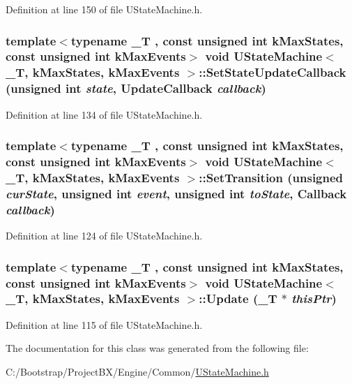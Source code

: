 Definition at line 150 of file UStateMachine.h.\hypertarget{class_u_state_machine_4ad66bcfa1dd9b29fedccc5ee19d5a1d}{
\subsubsection[{SetStateUpdateCallback}]{\setlength{\rightskip}{0pt plus 5cm}template$<$typename \_\-T , const unsigned int kMaxStates, const unsigned int kMaxEvents$>$ void {\bf UStateMachine}$<$ \_\-T, kMaxStates, kMaxEvents $>$::SetStateUpdateCallback (unsigned int {\em state}, \/  {\bf UpdateCallback} {\em callback})}}
\label{class_u_state_machine_4ad66bcfa1dd9b29fedccc5ee19d5a1d}




Definition at line 134 of file UStateMachine.h.\hypertarget{class_u_state_machine_eb4c6dc6eaef564984dff22a2defe593}{
\subsubsection[{SetTransition}]{\setlength{\rightskip}{0pt plus 5cm}template$<$typename \_\-T , const unsigned int kMaxStates, const unsigned int kMaxEvents$>$ void {\bf UStateMachine}$<$ \_\-T, kMaxStates, kMaxEvents $>$::SetTransition (unsigned {\em curState}, \/  unsigned int {\em event}, \/  unsigned int {\em toState}, \/  {\bf Callback} {\em callback})}}
\label{class_u_state_machine_eb4c6dc6eaef564984dff22a2defe593}




Definition at line 124 of file UStateMachine.h.\hypertarget{class_u_state_machine_bf82a8c4731c6c736782ea9f2ccac1b4}{
\subsubsection[{Update}]{\setlength{\rightskip}{0pt plus 5cm}template$<$typename \_\-T , const unsigned int kMaxStates, const unsigned int kMaxEvents$>$ void {\bf UStateMachine}$<$ \_\-T, kMaxStates, kMaxEvents $>$::Update (\_\-T $\ast$ {\em thisPtr})}}
\label{class_u_state_machine_bf82a8c4731c6c736782ea9f2ccac1b4}




Definition at line 115 of file UStateMachine.h.

The documentation for this class was generated from the following file:\begin{CompactItemize}
\item 
C:/Bootstrap/ProjectBX/Engine/Common/\hyperlink{_u_state_machine_8h}{UStateMachine.h}\end{CompactItemize}
